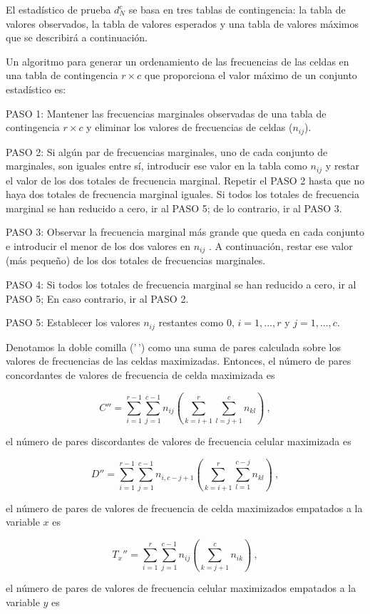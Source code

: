 \documentclass[12pt,a4paper,]{book}
\numberwithin{dummy}{section}
\theoremstyle{ocrenumbox}
\theoremstyle{blacknumex}
\theoremstyle{blacknumbox}
\theoremstyle{ocrenum}
\theoremstyle{ocrenum}
\begin{document}
El estadístico de prueba \(d_N^c\) se basa en tres tablas de
contingencia: la tabla de valores observados, la tabla de valores
esperados y una tabla de valores máximos que se describirá a
continuación.

Un algoritmo para generar un ordenamiento de las frecuencias de las
celdas en una tabla de contingencia \(r\times c\) que proporciona el
valor máximo de un conjunto estadístico es:

PASO 1: Mantener las frecuencias marginales observadas de una tabla de
contingencia \(r\times c\) y eliminar los valores de frecuencias de
celdas (\(n_{ij}\)).

PASO 2: Si algún par de frecuencias marginales, uno de cada conjunto de
marginales, son iguales entre sí, introducir ese valor en la tabla como
\(n_{ij}\) y restar el valor de los dos totales de frecuencia marginal.
Repetir el PASO 2 hasta que no haya dos totales de frecuencia marginal
iguales. Si todos los totales de frecuencia marginal se han reducido a
cero, ir al PASO 5; de lo contrario, ir al PASO 3.

PASO 3: Observar la frecuencia marginal más grande que queda en cada
conjunto e introducir el menor de los dos valores en \(n_{ij}\) . A
continuación, restar ese valor (más pequeño) de los dos totales de
frecuencias marginales.

PASO 4: Si todos los totales de frecuencia marginal se han reducido a
cero, ir al PASO 5; En caso contrario, ir al PASO 2.

PASO 5: Establecer los valores \(n_{ij}\) restantes como \(0\),
\(i = 1, . . . , r\) y \(j = 1, . . . , c\).

Denotamos la doble comilla ('\,') como una suma de pares calculada sobre
los valores de frecuencias de las celdas maximizadas. Entonces, el
número de pares concordantes de valores de frecuencia de celda
maximizada es

\[
C''=\sum_{i=1}^{r-1}\sum_{j=1}^{c-1}n_{ij}(\sum_{k=i+1}^r\sum_{l=j+1}^cn_{kl})~,
\]

el número de pares discordantes de valores de frecuencia celular
maximizada es

\[
D''=\sum_{i=1}^{r-1}\sum_{j=1}^{c-1}n_{i,c-j+1}(\sum_{k=i+1}^r\sum_{l=1}^{c-j}n_{kl})~,
\]

el número de pares de valores de frecuencia de celda maximizados
empatados a la variable \(x\) es

\[
T_x''=\sum_{i=1}^{r}\sum_{j=1}^{c-1}n_{ij}(\sum_{k=j+1}^cn_{ik})~,
\]

el número de pares de valores de frecuencia celular maximizados
empatados a la variable \(y\) es
\end{document}
